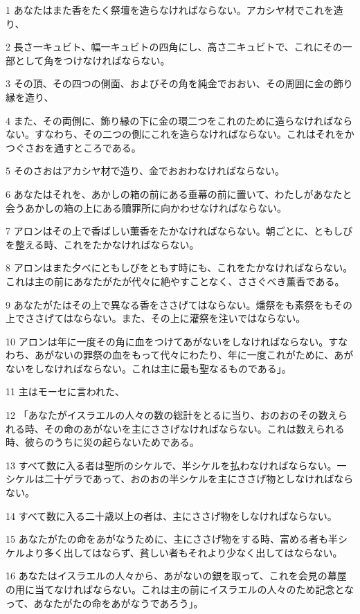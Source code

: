 \par 1 あなたはまた香をたく祭壇を造らなければならない。アカシヤ材でこれを造り、
\par 2 長さ一キュビト、幅一キュビトの四角にし、高さ二キュビトで、これにその一部として角をつけなければならない。
\par 3 その頂、その四つの側面、およびその角を純金でおおい、その周囲に金の飾り縁を造り、
\par 4 また、その両側に、飾り縁の下に金の環二つをこれのために造らなければならない。すなわち、その二つの側にこれを造らなければならない。これはそれをかつぐさおを通すところである。
\par 5 そのさおはアカシヤ材で造り、金でおおわなければならない。
\par 6 あなたはそれを、あかしの箱の前にある垂幕の前に置いて、わたしがあなたと会うあかしの箱の上にある贖罪所に向かわせなければならない。
\par 7 アロンはその上で香ばしい薫香をたかなければならない。朝ごとに、ともしびを整える時、これをたかなければならない。
\par 8 アロンはまた夕べにともしびをともす時にも、これをたかなければならない。これは主の前にあなたがたが代々に絶やすことなく、ささぐべき薫香である。
\par 9 あなたがたはその上で異なる香をささげてはならない。燔祭をも素祭をもその上でささげてはならない。また、その上に灌祭を注いではならない。
\par 10 アロンは年に一度その角に血をつけてあがないをしなければならない。すなわち、あがないの罪祭の血をもって代々にわたり、年に一度これがために、あがないをしなければならない。これは主に最も聖なるものである」。
\par 11 主はモーセに言われた、
\par 12 「あなたがイスラエルの人々の数の総計をとるに当り、おのおのその数えられる時、その命のあがないを主にささげなければならない。これは数えられる時、彼らのうちに災の起らないためである。
\par 13 すべて数に入る者は聖所のシケルで、半シケルを払わなければならない。一シケルは二十ゲラであって、おのおの半シケルを主にささげ物としなければならない。
\par 14 すべて数に入る二十歳以上の者は、主にささげ物をしなければならない。
\par 15 あなたがたの命をあがなうために、主にささげ物をする時、富める者も半シケルより多く出してはならず、貧しい者もそれより少なく出してはならない。
\par 16 あなたはイスラエルの人々から、あがないの銀を取って、これを会見の幕屋の用に当てなければならない。これは主の前にイスラエルの人々のため記念となって、あなたがたの命をあがなうであろう」。
